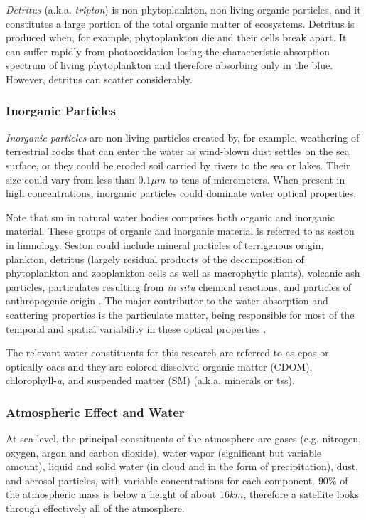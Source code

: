 {\it Detritus} (a.k.a. {\it tripton}) is non-phytoplankton, non-living organic particles, and it constitutes a large portion of the total organic matter of ecosystems. Detritus is produced when, for example, phytoplankton die and their cells break apart. It can suffer rapidly from photooxidation losing the characteristic absorption spectrum of living phytoplankton and therefore absorbing only in the blue. However, detritus can scatter considerably.  
\subsubsection*{Inorganic Particles}

{\it Inorganic particles} are non-living particles created by, for example, weathering of terrestrial rocks that can enter the water as wind-blown dust settles on the sea surface, or they could be eroded soil carried by rivers to the sea or lakes. Their size could vary from less than $0.1\mu m$ to tens of micrometers. When present in high concentrations, inorganic particles could dominate water optical properties.

Note that \acrfull{sm} in natural water bodies comprises both organic and inorganic material. These groups of organic and inorganic material is referred to as seston in limnology. Seston could include mineral particles of terrigenous origin, plankton, detritus (largely residual products of the decomposition of phytoplankton and zooplankton cells as well as macrophytic plants), volcanic ash particles, particulates resulting from {\it in situ} chemical reactions, and particles of anthropogenic origin \cite{Bukata1995}. The major contributor to the water absorption and scattering properties is the particulate matter, being responsible for most of the temporal and spatial variability in these optical properties \cite{Mobley:2001}.

The relevant water constituents for this research are referred to as \acrfull{cpas} or optically \gls{oacs} and they are colored dissolved organic matter (CDOM), chlorophyll-{\it a}, and suspended matter (SM) (a.k.a. minerals or \gls{tss}).

\subsubsection{Atmospheric Effect and Water}
At sea level, the principal constituents of the atmosphere are gases (e.g. nitrogen, oxygen, argon and carbon dioxide), water vapor (significant but variable amount), liquid and solid water (in cloud and in the form of precipitation), dust, and aerosol particles, with variable concentrations for each component. $90\%$ of the atmospheric mass is below a height of about $16km$, therefore a satellite looks through effectively all of the atmosphere.


